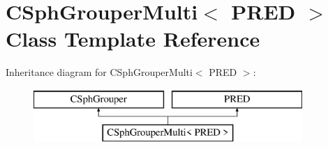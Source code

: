 \hypertarget{classCSphGrouperMulti}{\section{C\-Sph\-Grouper\-Multi$<$ P\-R\-E\-D $>$ Class Template Reference}
\label{classCSphGrouperMulti}
}
Inheritance diagram for C\-Sph\-Grouper\-Multi$<$ P\-R\-E\-D $>$\-:\begin{figure}[H]
\begin{center}
\leavevmode
\includegraphics[height=2.000000cm]{classCSphGrouperMulti}
\end{center}
\end{figure}
